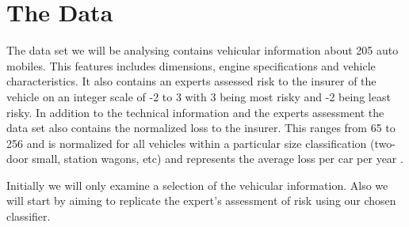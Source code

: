 \chapter{The Data}

The data set we will be analysing contains vehicular information about 205 auto mobiles. This features includes dimensions, engine specifications and vehicle characteristics. It also contains an experts assessed risk to the insurer of the vehicle on an integer scale of -2 to 3 with 3 being most risky and -2 being least risky. In addition to the technical information and the experts assessment the data set also contains the normalized loss to the insurer. This ranges from 65 to 256 and is normalized for all vehicles within a particular size classification (two-door small, station wagons, etc) and represents the average loss per car per year \cite{Automobile}.

Initially we will only examine a selection of the vehicular information. Also we will start by aiming to replicate the expert's assessment of risk using our chosen classifier.